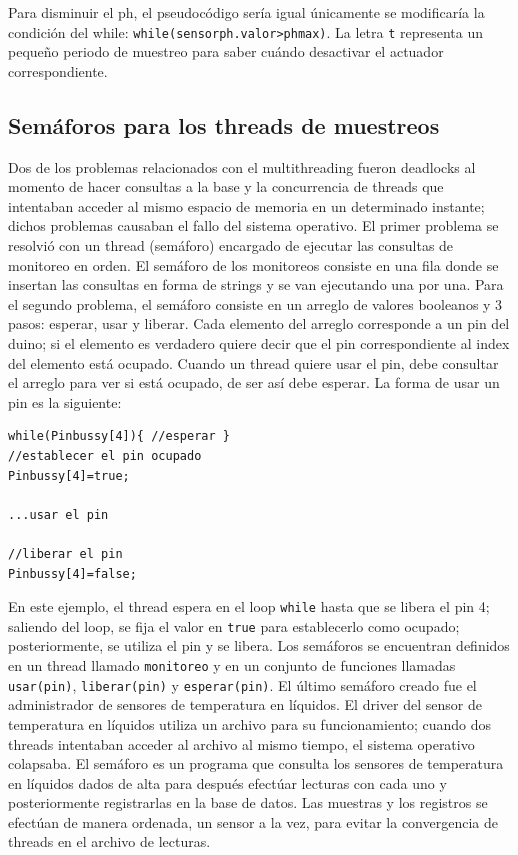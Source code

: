 \documentclass[a4paper,10pt,titlepage]{article}
\begin{document}
Para disminuir el ph, el pseudoc\'odigo ser\'ia igual \'unicamente se modificar\'ia la condici\'on del while: \verb|while(sensorph.valor>phmax)|. La letra \verb|t| 
representa un peque\~no periodo de muestreo para saber cu\'ando desactivar 
el actuador correspondiente.

\subsection{Sem\'aforos para los threads de muestreos}
Dos de los problemas relacionados con el multithreading fueron deadlocks al momento de hacer consultas a la base y la concurrencia de threads que intentaban acceder al 
mismo espacio de memoria en un determinado instante; dichos problemas causaban el fallo del sistema operativo. El primer problema se resolvi\'o con un 
thread (sem\'aforo)
encargado de ejecutar las consultas de monitoreo en orden. El sem\'aforo de los monitoreos consiste en una fila donde se insertan las 
consultas en forma de strings y se van 
ejecutando una por una. Para el segundo problema, el sem\'aforo consiste en un arreglo de valores booleanos y 3 pasos: esperar, usar y liberar. Cada elemento del 
arreglo 
corresponde a un pin del duino; si el elemento es verdadero quiere decir que el pin correspondiente al index del elemento est\'a ocupado. Cuando un thread quiere usar 
el pin, debe consultar el arreglo para ver si est\'a ocupado, de ser as\'i debe esperar. La forma de usar un pin es la siguiente:

\begin{verbatim}
while(Pinbussy[4]){ //esperar }
//establecer el pin ocupado
Pinbussy[4]=true;

...usar el pin

//liberar el pin
Pinbussy[4]=false;
\end{verbatim}

En este ejemplo, el thread espera en el loop \verb|while| hasta que se libera el pin 4; saliendo del loop, se fija el valor en \verb|true| para establecerlo como ocupado; 
posteriormente, se utiliza el pin y se libera. Los sem\'aforos se encuentran 
definidos en un thread llamado \verb|monitoreo| y en un conjunto de funciones llamadas \verb|usar(pin)|, \verb|liberar(pin)| y \verb|esperar(pin)|. El \'ultimo sem\'aforo 
creado fue el administrador de sensores de temperatura en l\'iquidos. El driver del sensor de temperatura en l\'iquidos utiliza un archivo para su funcionamiento; cuando 
dos threads intentaban acceder al archivo al mismo tiempo, el sistema operativo colapsaba. El sem\'aforo es un programa que consulta los
sensores de temperatura en l\'iquidos dados de alta para despu\'es efect\'uar lecturas con cada uno y posteriormente registrarlas 
en la base de datos. Las muestras y los registros se efect\'uan de manera ordenada, un sensor a la vez, para evitar la convergencia de threads en el archivo de lecturas.
\end{document}
